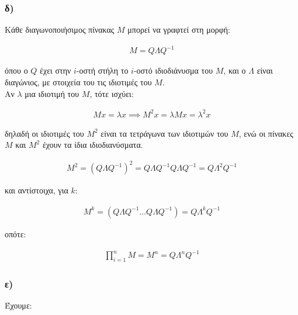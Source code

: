 \documentclass[12pt,a4paper]{article}
\begin{document}
			\subsubsection*{δ)}
				Κάθε διαγωνοποιήσιμος πίνακας $M$ μπορεί να γραφτεί στη μορφή:
				
				\begin{align*}
					M = Q \varLambda Q^{-1}
				\end{align*}
				
				όπου ο $Q$ έχει στην $i$-οστή στήλη το $i$-οστό ιδιοδιάνυσμα του $M$, και ο $\varLambda$ είναι διαγώνιος, με στοιχεία του τις ιδιοτιμές του $M$. \\
				
				Αν $\lambda$ μια ιδιοτιμή του $M$, τότε ισχύει:
				
				\begin{align*}
					Mx = \lambda x \implies M^2x = \lambda Mx = \lambda^2 x
				\end{align*}
				
				δηλαδή οι ιδιοτιμές του $M^2$ είναι τα τετράγωνα των ιδιοτιμών του $M$, ενώ οι πίνακες $M$ και $M^2$ έχουν τα ίδια ιδιοδιανύσματα.
				
				\begin{align*}
					M^2 = \left(Q \varLambda Q^{-1}\right)^2 = Q \varLambda Q^{-1} Q \varLambda Q^{-1} = Q \varLambda^2 Q^{-1} 
				\end{align*}
				
				και αντίστοιχα, για $k$:
				
				\begin{align*}
					M^k = \left(Q \varLambda Q^{-1} \ldots Q \varLambda Q^{-1}\right) = Q \varLambda^k Q^{-1}
				\end{align*}
				
				οπότε:
				
				\begin{align*}
					\prod_{i=1}^{n} M = M^n = Q \varLambda^n Q^{-1}
				\end{align*}
		
			\subsubsection*{ε)}
				Έχουμε:
				
\end{document}
